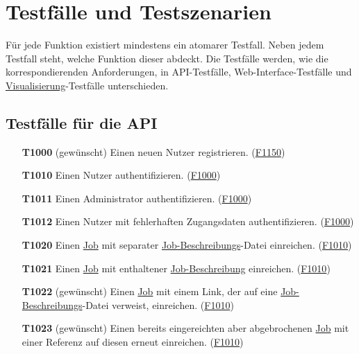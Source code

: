 \section{Testfälle und Testszenarien}
Für jede Funktion existiert mindestens ein atomarer Testfall. Neben jedem Testfall steht, welche Funktion dieser abdeckt. Die Testfälle werden, wie die korrespondierenden Anforderungen, in \gls{API}-Testfälle, \gls{Web-Interface}-Testfälle und \hyperref[pages:visualization]{Visualisierung}-Testfälle unterschieden.

\subsection{Testfälle für die \gls{API}}


\begin{itemize}

    \item[\textbf{T1000}] (gewünscht) Einen neuen \gls{Nutzer} registrieren. (\hyperref[FA:API:Registrierung von Nutzern]{F1150})
    
    \item[\textbf{T1010}] Einen \gls{Nutzer} authentifizieren. (\hyperref[FA:API:Authentifizieren von Nutzern]{F1000})
    
    \item[\textbf{T1011}] Einen \gls{Administrator} authentifizieren. (\hyperref[FA:API:Authentifizieren von Nutzern]{F1000})
    
    \item[\textbf{T1012}] Einen \gls{Nutzer} mit fehlerhaften Zugangsdaten authentifizieren. (\hyperref[FA:API:Authentifizieren von Nutzern]{F1000})
    
    \item[\textbf{T1020}] Einen \hyperref[B:Jobs]{Job} mit separater \hyperref[B:Job-Beschreibung]{Job-Beschreibungs}-Datei einreichen. (\hyperref[FA:API:Einreichen von Jobs]{F1010})
    
    \item[\textbf{T1021}] Einen \hyperref[B:Jobs]{Job} mit enthaltener \hyperref[B:Job-Beschreibung]{Job-Beschreibung} einreichen. (\hyperref[FA:API:Einreichen von Jobs]{F1010})
    
    \item[\textbf{T1022}] (gewünscht) Einen \hyperref[B:Jobs]{Job} mit einem Link, der auf eine \hyperref[B:Job-Beschreibung]{Job-Beschreibungs}-Datei verweist, einreichen. (\hyperref[FA:API:Einreichen von Jobs]{F1010})
    
    \item[\textbf{T1023}] (gewünscht) Einen bereits eingereichten aber abgebrochenen \hyperref[B:Jobs]{Job} mit einer Referenz auf diesen erneut einreichen. (\hyperref[FA:API:Einreichen von Jobs]{F1010})
    

\end{itemize}
